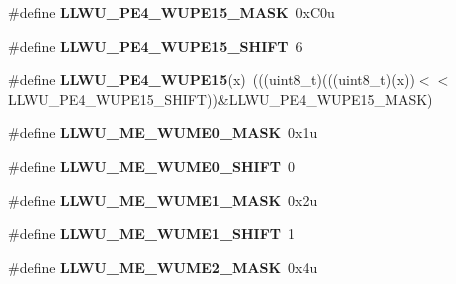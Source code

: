 \begin{DoxyCompactItemize}
\item 
\#define {\bfseries L\+L\+W\+U\+\_\+\+P\+E4\+\_\+\+W\+U\+P\+E15\+\_\+\+M\+A\+SK}~0x\+C0u\hypertarget{group__LLWU__Register__Masks_ga53e48ffd153996ab89adb3c4df7511ee}{}\label{group__LLWU__Register__Masks_ga53e48ffd153996ab89adb3c4df7511ee}

\item 
\#define {\bfseries L\+L\+W\+U\+\_\+\+P\+E4\+\_\+\+W\+U\+P\+E15\+\_\+\+S\+H\+I\+FT}~6\hypertarget{group__LLWU__Register__Masks_gaeaf1e05b8de75133c46d6f11b3346732}{}\label{group__LLWU__Register__Masks_gaeaf1e05b8de75133c46d6f11b3346732}

\item 
\#define {\bfseries L\+L\+W\+U\+\_\+\+P\+E4\+\_\+\+W\+U\+P\+E15}(x)~(((uint8\+\_\+t)(((uint8\+\_\+t)(x))$<$$<$L\+L\+W\+U\+\_\+\+P\+E4\+\_\+\+W\+U\+P\+E15\+\_\+\+S\+H\+I\+FT))\&L\+L\+W\+U\+\_\+\+P\+E4\+\_\+\+W\+U\+P\+E15\+\_\+\+M\+A\+SK)\hypertarget{group__LLWU__Register__Masks_gadd015539f974ee2820707b9abf3787ba}{}\label{group__LLWU__Register__Masks_gadd015539f974ee2820707b9abf3787ba}

\item 
\#define {\bfseries L\+L\+W\+U\+\_\+\+M\+E\+\_\+\+W\+U\+M\+E0\+\_\+\+M\+A\+SK}~0x1u\hypertarget{group__LLWU__Register__Masks_ga5f1588218d510ac13093055708ceae49}{}\label{group__LLWU__Register__Masks_ga5f1588218d510ac13093055708ceae49}

\item 
\#define {\bfseries L\+L\+W\+U\+\_\+\+M\+E\+\_\+\+W\+U\+M\+E0\+\_\+\+S\+H\+I\+FT}~0\hypertarget{group__LLWU__Register__Masks_ga7f653f4ce89c4512437c0114f4659502}{}\label{group__LLWU__Register__Masks_ga7f653f4ce89c4512437c0114f4659502}

\item 
\#define {\bfseries L\+L\+W\+U\+\_\+\+M\+E\+\_\+\+W\+U\+M\+E1\+\_\+\+M\+A\+SK}~0x2u\hypertarget{group__LLWU__Register__Masks_ga99b29643134140d21a3d4259b7f64c86}{}\label{group__LLWU__Register__Masks_ga99b29643134140d21a3d4259b7f64c86}

\item 
\#define {\bfseries L\+L\+W\+U\+\_\+\+M\+E\+\_\+\+W\+U\+M\+E1\+\_\+\+S\+H\+I\+FT}~1\hypertarget{group__LLWU__Register__Masks_gac623d0db3076972370ee795830b555c1}{}\label{group__LLWU__Register__Masks_gac623d0db3076972370ee795830b555c1}

\item 
\#define {\bfseries L\+L\+W\+U\+\_\+\+M\+E\+\_\+\+W\+U\+M\+E2\+\_\+\+M\+A\+SK}~0x4u\hypertarget{group__LLWU__Register__Masks_ga9f19f501dd2ad4aa2f7b01ac8edf8056}{}\label{group__LLWU__Register__Masks_ga9f19f501dd2ad4aa2f7b01ac8edf8056}


\end{DoxyCompactItemize}
